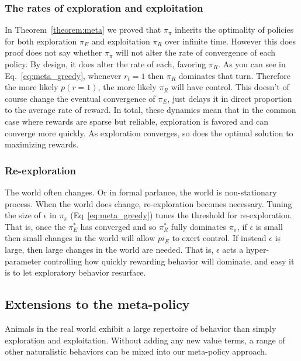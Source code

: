 \documentclass[9pt,twocolumn,twoside]{pnas-new}
\begin{document}
\subsubsection*{The rates of exploration and exploitation}
In Theorem~\ref{theorem:meta} we proved that $\pi_{\pi}$ inherits the optimality of policies for both exploration $\pi_E$ and exploitation $\pi_R$ over infinite time. However this does proof does not say whether $\pi_{\pi}$ will not alter the rate of convergence of each policy. By design, it does alter the rate of each, favoring $\pi_R$. As you can see in Eq.~\ref{eq:meta_greedy}, whenever $r_t = 1$ then $\pi_R$ dominates that turn. Therefore the more likely $p(r=1)$, the more likely $\pi_R$ will have control. This doesn't of course change the eventual convergence of $\pi_E$, just delays it in direct proportion to the average rate of reward. In total, these dynamics mean that in the common case where rewards are sparse but reliable, exploration is favored and can converge more quickly. As exploration converges, so does the optimal solution to maximizing rewards.

\subsubsection*{Re-exploration}
The world often changes. Or in formal parlance, the world is non-stationary process. When the world does change, re-exploration becomes necessary. Tuning the size of $\epsilon$ in $\pi_{\pi}$ (Eq~\ref{eq:meta_greedy}) tunes the threshold for re-exploration. That is, once the $\pi^*_E$ has converged and so $\pi^*_R$ fully dominates $\pi_{\pi}$, if $\epsilon$ is small then small changes in the world will allow $pi_E$ to exert control. If instead $\epsilon$ is large, then large changes in the world are needed. That is, $\epsilon$ acts a hyper-parameter controlling how quickly rewarding behavior will dominate, and easy it is to let exploratory behavior resurface.

\subsection*{Extensions to the meta-policy}
Animals in the real world exhibit a large repertoire of behavior than simply exploration and exploitation. Without adding any new value terms, a range of other naturalistic behaviors can be mixed into our meta-policy approach. 
\end{document}
